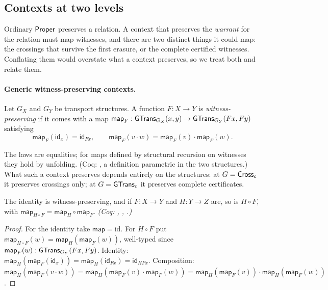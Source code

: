 \subsection{Contexts at two levels}\label{sec:contexts}
Ordinary $\mathsf{Proper}$ preserves a relation. A context that preserves the \emph{warrant} for the relation must map witnesses, and there are two distinct things it could map: the crossings that survive the first erasure, or the complete certified witnesses. Conflating them would overstate what a context preserves, so we treat both and relate them.

\paragraph{Generic witness-preserving contexts.}
\begin{defi}\label{def:gp}
Let $G_X$ and $G_Y$ be transport structures. A function $F : X \to Y$ is \emph{witness-preserving} if it comes with a map $\mathsf{map}_F : \mathsf{GTrans}_{G_X}(x,y) \to \mathsf{GTrans}_{G_Y}(Fx,Fy)$ satisfying
\[
\mathsf{map}_F(\mathsf{id}_x) = \mathsf{id}_{Fx}, \qquad \mathsf{map}_F(v \cdot w) = \mathsf{map}_F(v) \cdot \mathsf{map}_F(w).
\]
\end{defi}
The laws are equalities; for maps defined by structural recursion on witnesses they hold by unfolding. (Coq: , a definition parametric in the two structures.) What such a context preserves depends entirely on the structures: at $G = \mathsf{Cross}_c$ it preserves crossings only; at $G = \mathsf{GTrans}_c$ it preserves complete certificates.

\begin{thm}[Composition]\label{thm:gpcomp}
The identity is witness-preserving, and if $F : X \to Y$ and $H : Y \to Z$ are, so is $H \circ F$, with $\mathsf{map}_{H \circ F} = \mathsf{map}_H \circ \mathsf{map}_F$. \emph{(Coq: , , .)}
\end{thm}
\begin{proof}
For the identity take $\mathsf{map} = \mathrm{id}$. For $H \circ F$ put $\mathsf{map}_{H\circ F}(w) = \mathsf{map}_H(\mathsf{map}_F(w))$, well-typed since $\mathsf{map}_F(w) : \mathsf{GTrans}_{G_Y}(Fx,Fy)$. Identity: $\mathsf{map}_H(\mathsf{map}_F(\mathsf{id}_x)) = \mathsf{map}_H(\mathsf{id}_{Fx}) = \mathsf{id}_{HFx}$. Composition: $\mathsf{map}_H(\mathsf{map}_F(v \cdot w)) = \mathsf{map}_H(\mathsf{map}_F(v) \cdot \mathsf{map}_F(w)) = \mathsf{map}_H(\mathsf{map}_F(v)) \cdot \mathsf{map}_H(\mathsf{map}_F(w))$.
\end{proof}

